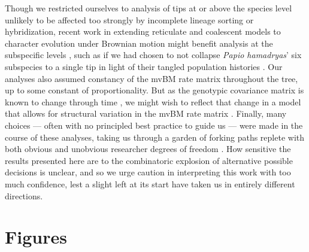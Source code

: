 Though we restricted ourselves to analysis of tips at or above the species level unlikely to be affected too strongly by incomplete lineage sorting or hybridization, recent work in extending reticulate and coalescent models to character evolution under Brownian motion might benefit analysis at the subspecific levels \citep{bastidePhylogeneticComparativeMethods2018, mendesMultispeciesCoalescentModel2018}, such as if we had chosen to not collapse \textit{Papio hamadryas}' six subspecies to a single tip in light of their tangled population histories \citep{rogersComparativeGenomicsComplex2019}. Our analyses also assumed constancy of the mvBM rate matrix throughout the tree, up to some constant of proportionality. But as the genotypic covariance matrix is known to change through time \citep{arnoldUnderstandingEvolutionStability2008}, we might wish to reflect that change in a model that allows for structural variation in the mvBM rate matrix \citep{caetanoEstimatingCorrelatedRates2019}. Finally, many choices --- often with no principled best practice to guide us --- were made in the course of these analyses, taking us through a garden of forking paths replete with both obvious and unobvious researcher degrees of freedom \citep{simmonsFalsepositivePsychologyUndisclosed2011}. How sensitive the results presented here are to the combinatoric explosion of alternative possible decisions is unclear, and so we urge caution in interpreting this work with too much confidence, lest a slight left at its start have taken us in entirely different directions.

\clearpage

\section{Figures}

